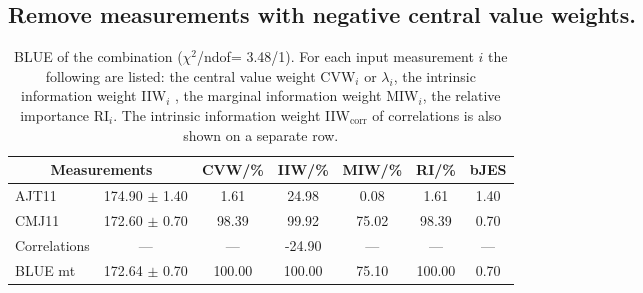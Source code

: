 \subsection{Remove measurements with negative central value weights.}
\begin{table}[H]
\scriptsize
\begin{center}
\renewcommand{\arraystretch}{1.1}
\begin{tabular}{|lc|c|c|c|c|c|}
\hline
\multicolumn{2}{|c|}{Measurements} & CVW/\%  & IIW/\%  & MIW/\%  & RI/\%  & {\tiny bJES}\\
\hline
AJT11 &     174.90 $\pm$       1.40 &       1.61 &      24.98 &       0.08 &       1.61 &       1.40\\
CMJ11 &     172.60 $\pm$       0.70 &      98.39 &      99.92 &      75.02 &      98.39 &       0.70\\
Correlations & --- & --- &     -24.90 & --- & --- & ---\\
\hline
BLUE {\tiny mt} &     172.64 $\pm$       0.70 &     100.00 &     100.00 &      75.10 &     100.00 &       0.70\\
\hline
\end{tabular}
\caption{BLUE of the combination ($\chi^2$/ndof=      3.48/1).
 For each input measurement $i$ the following are listed: the central value weight CVW$_i$ or $\lambda_i$, the intrinsic information weight IIW$_i$ , the marginal information weight MIW$_i$, the relative importance RI$_i$. The intrinsic information weight IIW$_{\mathrm{corr}}$ of correlations is also shown on a separate row.}
\renewcommand{\arraystretch}{1}
\end{center}
\end{table}
